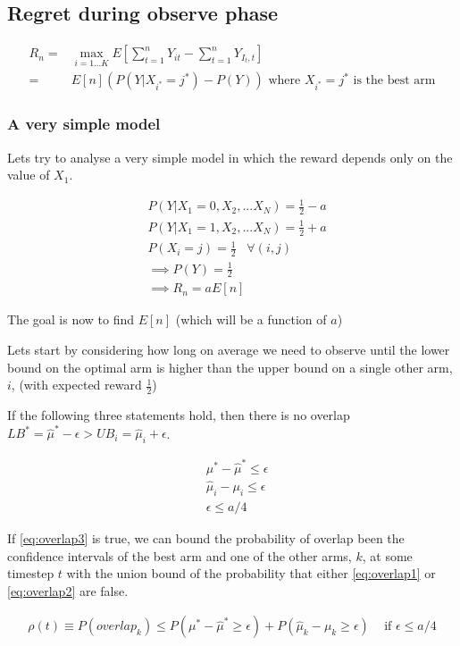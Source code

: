 \documentclass{article}
\newcommand{\eqn}[1]{\begin{align}#1\end{align}}
\theoremstyle{plain}
\theoremstyle{definition}
\begin{document}
\subsection{Regret during observe phase}


\eqn {
R_n = & \max_{i=1...K} E\left[\sum_{t=1}^n Y_{it} - \sum_{t=1}^n Y_{I_t,t} \right] \\
= & E[n]\left(P(Y|X_{i^*}={j^*})  - P(Y)\right) \text{ where } X_{i^*}={j^*} \text{ is the best arm}
}

 
\subsubsection{A very simple model}

Lets try to analyse a very simple model in which the reward depends only on the value of $X_1$.

\eqn{
&P(Y|X_1=0,X_2,...X_N) = \frac{1}{2}-a\\
&P(Y|X_1=1,X_2,...X_N) = \frac{1}{2}+a\\
&P(X_i = j) = \frac{1}{2} \;\;\; \forall (i,j)\\
&\implies P(Y) = \frac{1}{2} \\
&\implies R_n = aE[n]
}

The goal is now to find $E[n]$ (which will be a function of $a$)

Lets start by considering how long on average we need to observe until the lower bound on the optimal arm is higher than the upper bound on a single other arm, $i$, (with expected reward $\frac{1}{2}$)

If the following three statements hold, then there is no overlap $LB^* = \hat{\mu}^* - \epsilon > UB_i = \hat{\mu}_i + \epsilon$.

\eqn {
\label{eq:overlap1}
&\mu^* - \hat{\mu}^* \leq \epsilon \\
\label{eq:overlap2}
&\hat{\mu}_i - \mu_i \leq \epsilon \\
\label{eq:overlap3}
&\epsilon \leq a/4
}

If \ref{eq:overlap3} is true, we can bound the probability of overlap  been the confidence intervals of the best arm and one of the other arms, $k$, at some timestep $t$ with the union bound of the probability that either \ref{eq:overlap1} or \ref{eq:overlap2} are false.

\eqn {
\rho(t) \equiv P(overlap_k) \leq 
P(\mu^* - \hat{\mu}^* \geq \epsilon) + P(\hat{\mu}_k - \mu_k \geq \epsilon)  \;\;\;\text{ if } \epsilon \leq a/4
}
\end{document}
